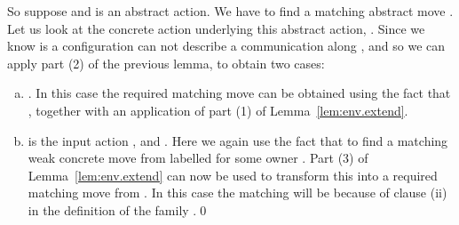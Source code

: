 \documentclass{LMCS}
\begin{document}
So suppose  
and   is an abstract action. 
We have to find a matching abstract move
.  
Let us look at the concrete action underlying this abstract action,  . Since we know
   is a configuration  can not describe a communication along , 
and so we can apply part (2) of the previous lemma, to obtain two cases:
\begin{enumerate}[(a)]
\item . In this case the required matching move
can be obtained using the fact that , together with
an application of part (1) of Lemma~\ref{lem:env.extend}. 

\item  is the input action  , and  
. Here we again use 
the fact that 
 to find a matching weak concrete move from 
      labelled
 for some owner . 
Part (3) of Lemma~\ref{lem:env.extend}
can now be used to transform this into a required matching move from 
. In this case the matching will be because of clause (ii) in the 
definition of the family .\qed  
\end{enumerate}
\end{document}
